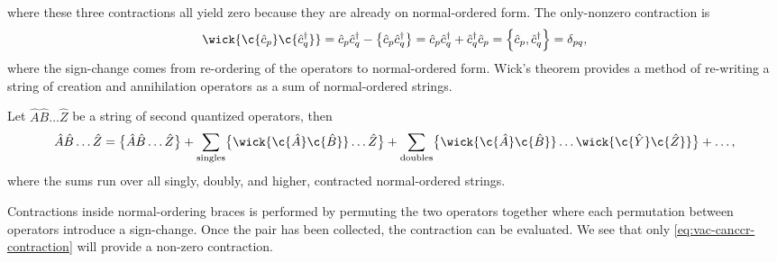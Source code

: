         where these three contractions all yield zero because they are already
        on normal-ordered form.
        The only-nonzero contraction is
        \begin{align}
            \wick{
                \c {\can{p}}
                \c {\ccr{q}}
            }
            = \can{p}\ccr{q}
            - \normalord{\can{p}\ccr{q}}
            = \can{p}\ccr{q}
            + \ccr{q}\can{p}
            = \acom{\can{p}}{\ccr{q}}
            = \delta_{pq},
            \label{eq:vac-canccr-contraction}
        \end{align}
        where the sign-change comes from re-ordering of the operators to
        normal-ordered form.
        Wick's theorem provides a method of re-writing a string of creation and
        annihilation operators as a sum of normal-ordered strings.
        \begin{theorem}
            \label{theorem:wick}
            Let $\hat{A}\hat{B}\dots\hat{Z}$ be a string of second quantized
            operators, then
            \begin{align}
                \hat{A}\hat{B}\dots\hat{Z}
                = \normalord{\hat{A}\hat{B}\dots\hat{Z}}
                + \sum_{\text{singles}} \normalord{
                    \wick{
                        \c {\hat{A}}
                        \c {\hat{B}}
                    }
                    \dots
                    \hat{Z}
                }
                + \sum_{\text{doubles}} \normalord{
                    \wick{
                        \c {\hat{A}}
                        \c {\hat{B}}
                    }
                    \dots
                    \wick{
                        \c {\hat{Y}}
                        \c {\hat{Z}}
                    }
                }
                + \dots,
            \end{align}
            where the sums run over all singly, doubly, and higher, contracted
            normal-ordered strings.
        \end{theorem}
        Contractions inside normal-ordering braces is performed by permuting
        the two operators together where each permutation between operators
        introduce a sign-change.
        Once the pair has been collected, the contraction can be evaluated.
        We see that only \autoref{eq:vac-canccr-contraction} will provide a
        non-zero contraction.

